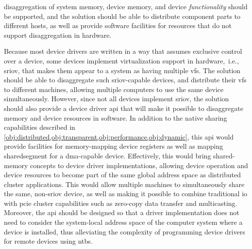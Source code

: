     
\begin{objective}\label{obj:disaggregation}
    \Gls{disaggregation} of system memory, device memory, and device \emph{functionality} should be supported, and the solution should be able to distribute component parts to different hosts, as well as provide software facilities for resources that do not support \gls{disaggregation} in hardware.
\end{objective}
Because most device drivers are written in a way that assumes exclusive control over a device, some devices implement virtualization support in hardware,~i.e., \gls{sriov}, that makes them appear to a system as having multiple \glspl{vf}. 
%
The solution should be able to \gls{disaggregate} such \gls{sriov}-capable devices, and distribute their \glspl{vf} to different machines, allowing multiple computers to use the same device simultaneously.
%
However, since not all devices implement \gls{sriov}, the solution should also provide a device driver \gls{api} that will make it possible to \gls{disaggregate} memory and device resources in software.
%
In addition to the native sharing capabilities described in \cref{obj:distributed,obj:transparent,obj:performance,obj:dynamic}, this \gls{api} 
would provide facilities for memory-mapping device registers as well as mapping \gls{sharedsegment} for a \gls{dma}-capable device.
%
Effectively, this would bring shared-memory concepts to device driver implementations, allowing device operation and device resources to become part of the same global address space as distributed cluster applications.
%
This would allow multiple machines to simultaneously share the same, non-\gls{sriov} device, as well as making it possible to combine traditional \gls{io} with \gls{pcie} cluster capabilities such as zero-copy data transfer and \gls{multicasting}.
%
Moreover, the \gls{api} should be designed so that a driver implementation does not need to consider the system-local address space of the computer system where a device is installed, thus alleviating the complexity of programming device drivers for remote devices using \glspl{ntb}.



